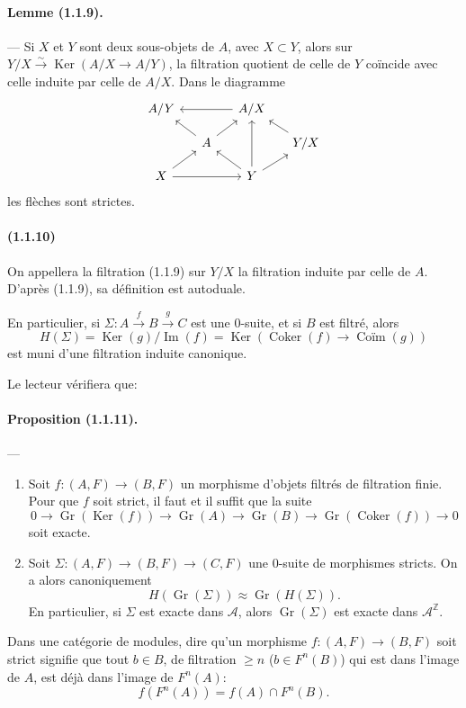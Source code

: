 \documentclass[10pt]{article}
\newcommand{\Z}{\mathbb Z}
\newcommand{\Gr}{\operatorname{Gr}}
\newcommand{\Ker}{\operatorname{Ker}}
\newcommand{\Coker}{\operatorname{Coker}}
\newcommand{\Imop}{\operatorname{Im}}
\newcommand{\calA}{\mathcal A}
\newcommand{\iso}{\xrightarrow{\sim}}
\begin{document}
\paragraph{Lemme (1.1.9).} --- Si $X$ et $Y$ sont deux sous-objets de $A$, avec $X\subset Y$, alors sur $Y/X\iso\Ker(A/X\to A/Y)$, la filtration quotient de celle de $Y$ coïncide avec celle induite par celle de $A/X$. Dans le diagramme
\[
\begin{tikzcd}[column sep=1.3em,row sep=1.0em]
A/Y && A/X \arrow[ll] & \\
& A \arrow[ul] \arrow[ur] && Y/X \arrow[ul] \\
X \arrow[ur] \arrow[rr] && Y \arrow[ul] \arrow[uu] \arrow[ur] &
\end{tikzcd}
\]
les flèches sont strictes.

\paragraph{(1.1.10)} On appellera la filtration (1.1.9) sur $Y/X$ la filtration induite par celle de $A$. D'après (1.1.9), sa définition est autoduale.

En particulier, si $\Sigma:A\xrightarrow{f}B\xrightarrow{g}C$ est une $0$-suite, et si $B$ est filtré, alors
\[
H(\Sigma)=\Ker(g)/\Imop(f)=\Ker(\Coker(f)\to\operatorname{Coïm}(g))
\]
est muni d'une filtration induite canonique.

Le lecteur vérifiera que:

\paragraph{Proposition (1.1.11).} --- \begin{enumerate}[label=(\roman*)]
\item Soit $f:(A,F)\to(B,F)$ un morphisme d'objets filtrés de filtration finie. Pour que $f$ soit strict, il faut et il suffit que la suite
\[
0\to\Gr(\Ker(f))\to\Gr(A)\to\Gr(B)\to\Gr(\Coker(f))\to0
\]
soit exacte.
\item Soit $\Sigma:(A,F)\to(B,F)\to(C,F)$ une $0$-suite de morphismes stricts. On a alors canoniquement
\[
H(\Gr(\Sigma))\approx\Gr(H(\Sigma)).
\]
En particulier, si $\Sigma$ est exacte dans $\calA$, alors $\Gr(\Sigma)$ est exacte dans $\calA^{\Z}$.
\end{enumerate}

Dans une catégorie de modules, dire qu'un morphisme $f:(A,F)\to(B,F)$ soit strict signifie que tout $b\in B$, de filtration $\ge n$ ($b\in F^n(B)$) qui est dans l'image de $A$, est déjà dans l'image de $F^n(A)$:
\[
f(F^n(A))=f(A)\cap F^n(B).
\]
\end{document}
